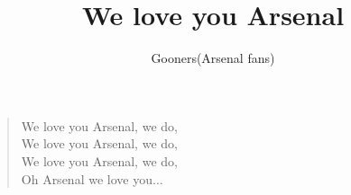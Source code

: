 \documentclass[a4paper,12pt]{article}
\title{We love you Arsenal}
\author{Gooners(Arsenal fans)}
\date{}
\begin{document}
	
	\maketitle
	
	\begin{verse}
		
		We love you Arsenal, we do, \\
		We love you Arsenal, we do, \\
		We love you Arsenal, we do, \\
		Oh Arsenal we love you$\ldots$
		
	\end{verse}
	
\end{document}
